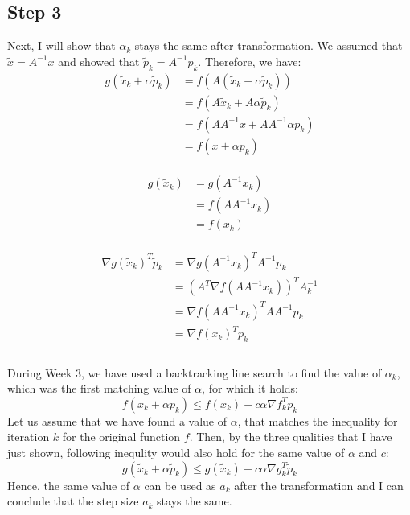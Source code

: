 \documentclass[a4paper]{article}
\begin{document}
\subsection{Step 3}
Next, I will show that $\alpha_k$ stays the same after transformation.
We assumed that $\tilde{x} =  A^{-1}x$ and showed that $\tilde{p}_k=A^{-1}p_k$.
Therefore, we have:
\[
\begin{aligned}
  g(\tilde{x}_k+\alpha \tilde{p}_k)
  &= f(A(\tilde{x}_k+\alpha \tilde{p}_k))\\
  &= f(A\tilde{x}_k + A\alpha \tilde{p}_k)\\
  &= f(AA^{-1}x + AA^{-1} \alpha p_k)\\
  &= f(x + \alpha p_k)
\end{aligned}
\]\\
\[
\begin{aligned}
  g(\tilde{x}_k)
  &= g(A^{-1}x_k)\\
  &= f(AA^{-1}x_k)\\
  &= f(x_k)
\end{aligned}
\]\\
\[
\begin{aligned}
  \nabla g(\tilde{x}_k)^T\tilde{p}_k
  &=\nabla g(A^{-1}x_k)^TA^{-1}p_k\\
   &= (A^T\nabla f(AA^{-1}x_k))^TA^{-1}_k\\
   &=\nabla f(AA^{-1}x_k)^TAA^{-1}p_k\\
   &= \nabla f(x_k)^Tp_k\\
\end{aligned}
\]\\
During Week 3, we have used a backtracking line search to find the value of $\alpha_k$,
which was the first matching value of $\alpha$, for which it holds:
\[
f(x_k + \alpha p_k) \leq f(x_k) + c\alpha\nabla f_k^Tp_k
\]
Let us assume that we have found a value of $\alpha$, that matches the
inequality for iteration $k$ for the original function $f$. Then, by the three
qualities that I have just shown, following inequlity would also hold for the
same value of $\alpha$ and $c$:
\[
g(\tilde{x}_k + \alpha \tilde{p}_k) \leq g(\tilde{x}_k) + c\alpha\nabla g_k^T\tilde{p}_k
\]
Hence, the same value of $\alpha$ can be used as $a_k$ after the transformation
and I can conclude that the step size $a_k$ stays the same.
\end{document}
